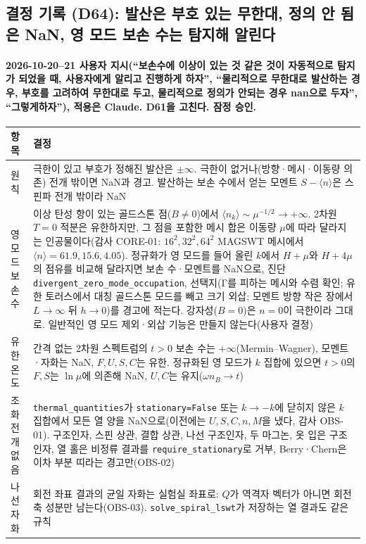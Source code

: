 \subsection{결정 기록 (D64): 발산은 부호 있는 무한대, 정의 안 됨은 NaN, 영 모드 보손 수는 탐지해 알린다}\label{decisions-d64-divergent-undefined}
\begingroup%
  \framesubtitle{2026-10-20--21 사용자 지시(``보손수에 이상이 있는 것 같은 것이 자동적으로 탐지가 되었을 때, 사용자에게 알리고 진행하게 하자'', ``물리적으로 무한대로 발산하는 경우, 부호를 고려하여 무한대로 두고, 물리적으로 정의가 안되는 경우 nan으로 두자'', ``그렇게하자''), 적용은 Claude. D61을 고친다. 잠정 승인.}
  \small\renewcommand{\arraystretch}{1.12}
  \begin{tabularx}{\textwidth}{@{}P{3.0cm}Y@{}}
    \toprule
    항목 & 결정 \\
    \midrule
    원칙 & 극한이 있고 부호가 정해진 발산은 $\pm\infty$. 극한이 없거나(방향·메시·이동량 의존) 전개 밖이면 NaN과 경고. 발산하는 보손 수에서 얻는 모멘트 $S-\langle n\rangle$은 스핀파 전개 밖이라 NaN \\
    영 모드 보손 수 & 이상 탄성 항이 있는 골드스톤 점($B\ne0$)에서 $\langle n_k\rangle\sim\mu^{-1/2}\to+\infty$. 2차원 $T=0$ 적분은 유한하지만, 그 점을 포함한 메시 합은 이동량 $\mu$에 따라 달라지는 인공물이다(감사 CORE-01: $16^2,32^2,64^2$ MAGSWT 메시에서 $\langle n\rangle=61.9,15.6,4.05$). 정규화가 영 모드를 들어 올린 $k$에서 $H+\mu$와 $H+4\mu$의 점유를 비교해 달라지면 보손 수·모멘트를 NaN으로, 진단 \texttt{divergent\_zero\_mode\_occupation}, 선택지(Γ를 피하는 메시와 수렴 확인; 유한 토러스에서 대칭 골드스톤 모드를 빼고 크기 외삽; 모멘트 방향 작은 장에서 $L\to\infty$ 뒤 $h\to0$)를 경고에 적는다. 강자성($B=0$)은 $n=0$이 극한이라 그대로. 일반적인 영 모드 제외·외삽 기능은 만들지 않는다(사용자 결정) \\
    유한 온도 & 간격 없는 2차원 스펙트럼의 $t>0$ 보손 수는 $+\infty$(Mermin--Wagner), 모멘트·자화는 NaN, $F,U,S,C$는 유한. 정규화된 영 모드가 $k$ 집합에 있으면 $t>0$의 $F,S$는 $\ln\mu$에 의존해 NaN, $U,C$는 유지($\omega n_B\to t$) \\
    조화 전개 없음 & \texttt{thermal\_quantities}가 \texttt{stationary=False} 또는 $k\to-k$에 닫히지 않은 $k$ 집합에서 모든 열 양을 NaN으로(이전에는 $U,S,C,n,M$을 냈다, 감사 OBS-01). 구조인자, 스핀 상관, 결합 상관, 나선 구조인자, 두 마그논, 옷 입은 구조인자, 열 홀은 비정류 결과를 \texttt{require\_stationary}로 거부, Berry·Chern은 이차 부분 띠라는 경고만(OBS-02) \\
    나선 자화 & 회전 좌표 결과의 균일 자화는 실험실 좌표로: $Q$가 역격자 벡터가 아니면 회전축 성분만 남는다(OBS-03). \texttt{solve\_spiral\_lswt}가 저장하는 열 결과도 같은 규칙 \\

\end{tabularx}
